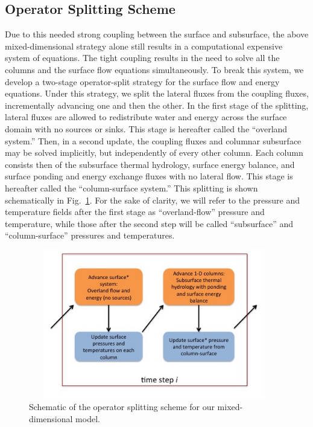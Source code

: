 \documentclass[review]{elsarticle}
\begin{document}
\subsection{Operator Splitting Scheme}
Due to this needed strong coupling between the surface and subsurface, the above mixed-dimensional strategy alone still results in a computational expensive system of equations.
The tight coupling results in the need to solve all the columns and the surface flow equations simultaneously.
To break this system, we develop a two-stage operator-split strategy for the surface flow and energy equations.
Under this strategy, we split the lateral fluxes from the coupling fluxes, incrementally advancing one and then the other.
In the first stage of the splitting, lateral fluxes are allowed to redistribute water and energy across the surface domain with no sources or sinks.
This stage is hereafter called the ``overland system.''
Then, in a second update, the coupling fluxes and columnar subsurface may be solved implicitly, but independently of every other column.
Each column consists then of the subsurface thermal hydrology, surface energy balance, and surface ponding and energy exchange fluxes with no lateral flow.
This stage is hereafter called the ``column-surface system.''
This splitting is shown schematically in Fig.~\ref{coupling-schematic}.
For the sake of clarity, we will refer to the pressure and temperature fields after the first stage as ``overland-flow'' pressure and temperature, while those after the second step will be called ``subsurface'' and ``column-surface'' pressures and temperatures.
%
\begin{figure}[h]
\centering
\includegraphics[height = 6.5cm, width=11cm]{figures/Figure5-new.jpg}
\caption{Schematic of the operator splitting scheme for our mixed-dimensional model.}
\label{coupling-schematic}
\end{figure}


\end{document}

